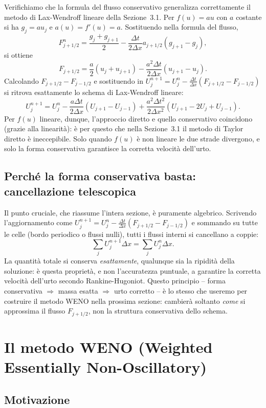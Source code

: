 \documentclass[12pt]{article}
\begin{document}
Verifichiamo che la formula del flusso conservativo generalizza correttamente il metodo di Lax-Wendroff lineare della Sezione~3.1. Per $f(u)=au$ con $a$ costante si ha $g_j=au_j$ e $a(u)=f'(u)=a$. Sostituendo nella formula del flusso,
\[
F_{j+1/2}^n = \frac{g_j+g_{j+1}}{2} - \frac{\Delta t}{2\Delta x}a_{j+1/2}(g_{j+1}-g_j),
\]
si ottiene
\[
F_{j+1/2} = \frac{a}{2}(u_j+u_{j+1}) - \frac{a^2\Delta t}{2\Delta x}(u_{j+1}-u_j).
\]
Calcolando $F_{j+1/2}-F_{j-1/2}$ e sostituendo in $U_j^{n+1}=U_j^n-\frac{\Delta t}{\Delta x}(F_{j+1/2}-F_{j-1/2})$ si ritrova esattamente lo schema di Lax-Wendroff lineare:
\[
U_j^{n+1} = U_j^n - \frac{a\Delta t}{2\Delta x}(U_{j+1}-U_{j-1}) + \frac{a^2\Delta t^2}{2\Delta x^2}(U_{j+1}-2U_j+U_{j-1}).
\]
Per $f(u)$ lineare, dunque, l'approccio diretto e quello conservativo coincidono (grazie alla linearità): è per questo che nella Sezione~3.1 il metodo di Taylor diretto è ineccepibile. Solo quando $f(u)$ è non lineare le due strade divergono, e solo la forma conservativa garantisce la corretta velocità dell'urto.

\subsection{Perché la forma conservativa basta: cancellazione telescopica}

Il punto cruciale, che riassume l'intera sezione, è puramente algebrico. Scrivendo l'aggiornamento come $U_j^{n+1}=U_j^n-\frac{\Delta t}{\Delta x}(F_{j+1/2}-F_{j-1/2})$ e sommando su tutte le celle (bordo periodico o flussi nulli), tutti i flussi interni si cancellano a coppie:
\[
\sum_j U_j^{n+1}\Delta x = \sum_j U_j^n\Delta x.
\]
La quantità totale si conserva \emph{esattamente}, qualunque sia la ripidità della soluzione: è questa proprietà, e non l'accuratezza puntuale, a garantire la corretta velocità dell'urto secondo Rankine-Hugoniot. Questo principio -- forma conservativa $\Rightarrow$ massa esatta $\Rightarrow$ urto corretto -- è lo stesso che useremo per costruire il metodo WENO nella prossima sezione: cambierà soltanto \emph{come} si approssima il flusso $F_{j+1/2}$, non la struttura conservativa dello schema.

\newpage

\section{Il metodo WENO (Weighted Essentially Non-Oscillatory)}

\subsection{Motivazione}
\end{document}
